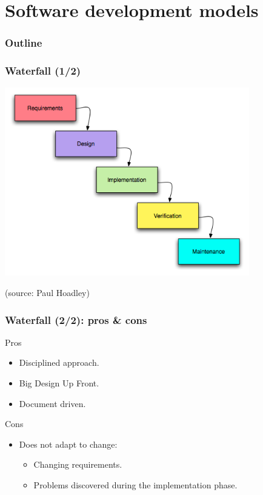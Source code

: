 \documentclass[10pt]{beamer}
\begin{document}
\section{Software development models}

\begin{frame}
  \frametitle{Outline}
  \tableofcontents[currentsection]
\end{frame}

\begin{frame}[fragile]
  \frametitle{Waterfall (1/2)}
  \includegraphics[width=0.8\textwidth]{Waterfall_model}

  \tiny(source: Paul Hoadley)
\end{frame}
\begin{frame}[fragile]
  \frametitle{Waterfall (2/2): pros \& cons}
  \begin{exampleblock}{Pros}
    \begin{itemize}
    \item Disciplined approach.
    \item Big Design Up Front.
    \item Document driven.
    \end{itemize}
  \end{exampleblock}
  \begin{alertblock}{Cons}
    \begin{itemize}
    \item Does not adapt to change:
      \begin{itemize}
      \item Changing requirements.
      \item Problems discovered during the implementation phase.
      \end{itemize}
    \end{itemize}
  \end{alertblock}
\end{frame}
\end{document}
